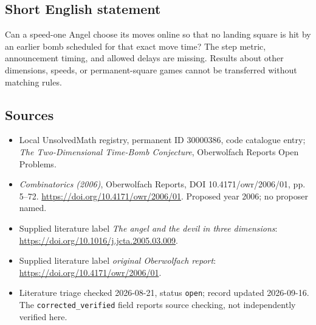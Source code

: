\documentclass[11pt]{article}
\begin{document}
\subsection{Short English statement}
Can a speed-one Angel choose its moves online so that no landing square is hit by an earlier bomb scheduled for that exact move time? The step metric, announcement timing, and allowed delays are missing. Results about other dimensions, speeds, or permanent-square games cannot be transferred without matching rules.
\subsection{Sources}
\begin{itemize}\item Local UnsolvedMath registry, permanent ID 30000386, code catalogue entry; \emph{The Two-Dimensional Time-Bomb Conjecture}, Oberwolfach Reports Open Problems.\item \emph{Combinatorics (2006)}, Oberwolfach Reports, DOI 10.4171/owr/2006/01, pp. 5--72. \url{https://doi.org/10.4171/owr/2006/01}. Proposed year 2006; no proposer named.\item Supplied literature label \emph{The angel and the devil in three dimensions}: \url{https://doi.org/10.1016/j.jcta.2005.03.009}.\item Supplied literature label \emph{original Oberwolfach report}: \url{https://doi.org/10.4171/owr/2006/01}.\item Literature triage checked 2026-08-21, status \texttt{open}; record updated 2026-09-16. The \texttt{corrected\_verified} field reports source checking, not independently verified here.\end{itemize}
\end{document}
